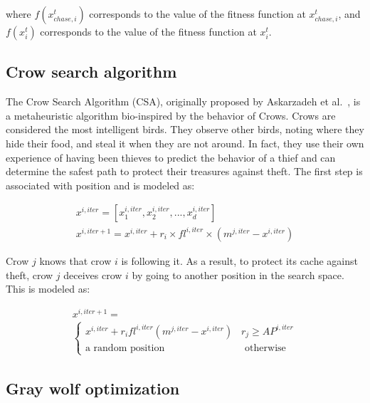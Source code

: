 \documentclass{elsarticle}
\begin{document}
\noindent 
where $f(x_{chase,i}^t)$ corresponds to the value of the fitness function at $x_{chase,i}^t$, and $f(x_{i}^t )$ corresponds to the value of the fitness function at $x_{i}^t$.

\subsection{Crow search algorithm}

The Crow Search Algorithm (CSA), originally proposed by Askarzadeh et al.~\cite{Askarzadeh2016}, is a metaheuristic algorithm bio-inspired by the behavior of Crows. Crows are considered the most intelligent birds. They observe other birds, noting where they hide their food, and steal it when they are not around. In fact, they use their own experience of having been thieves to predict the behavior of a thief and can determine the safest path to protect their treasures against theft. The first step is associated with position and is modeled as:

\begin{equation}
\begin{gathered}
x^{i,iter} = [x_{1}^{i,iter}, x_{2}^{i,iter},...,x_{d}^{i,iter}]\\
x^{i,iter+1}=x^{i,iter}+r_{i} \times fl^{i,iter} \times (m^{j,iter}-x^{i,iter})
\end{gathered}
\label{eq23}
\end{equation}

Crow $j$ knows that crow $i$ is following it. As a result, to protect its cache against theft, crow $j$ deceives crow $i$ by going to another position in the search space. This is modeled as:

\begin{equation}
\begin{gathered}
x^{i,iter+1}=\\
\begin{cases}
x^{i,iter}+r_{i} fl^{i,iter} (m^{j,iter} - x^{i,iter}) \; \; \; r_j \geq AP^{i,iter}\\
\text{a random position} \; \; \; \; \; \;\; \; \;\; \; \;\;\; \; \;\;\; \; \; \; \;\;\; \; \;\; \; \;  \text{otherwise}
\end{cases}
\end{gathered}
\label{eq24}
\end{equation}

\subsection{Gray wolf optimization}
\end{document}
